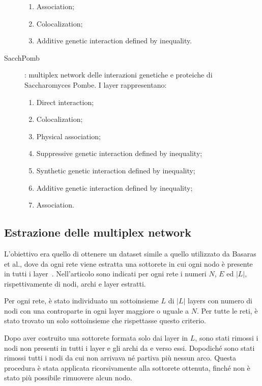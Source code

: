 \begin{description}
\begin{enumerate}
            \item Association;
            \item Colocalization;
            \item Additive genetic interaction defined by inequality.
        \end{enumerate} 
    \item[SacchPomb]: multiplex network delle interazioni genetiche e proteiche di 
        Saccharomyces Pombe. I layer rappresentano:
        \begin{enumerate}
            \item Direct interaction;
            \item Colocalization;
            \item Physical association;
            \item Suppressive genetic interaction defined by inequality;
            \item Synthetic genetic interaction defined by inequality;
            \item Additive genetic interaction defined by inequality;
            \item Association.
        \end{enumerate} 
\end{description}

\subsection{Estrazione delle multiplex network}
L'obiettivo era quello di ottenere un dataset simile a quello utilizzato da Basaras et al.,
dove da ogni rete viene estratta una sottorete in cui ogni nodo è presente in tutti i layer~\cite{basaras:infspmul}.
Nell'articolo sono indicati per ogni rete i numeri $N$, $E$ ed $|L|$, rispettivamente di nodi, 
archi e layer estratti.

Per ogni rete, è stato individuato un sottoinsieme $L$ di $|L|$ layers con
numero di nodi con una controparte in ogni layer maggiore o uguale a $N$. 
Per tutte le reti, è  stato trovato un solo sottoinsieme 
che rispettasse questo criterio.

Dopo aver costruito una sottorete formata solo dai layer in $L$, sono stati rimossi i nodi non presenti
in tutti i layer e gli archi da e verso essi. Dopodiché sono stati rimossi tutti i nodi da cui non arrivava
né partiva più nessun arco. Questa procedura è stata applicata ricorsivamente alla sottorete ottenuta, 
finché non è stato più possibile rimuovere alcun nodo.

